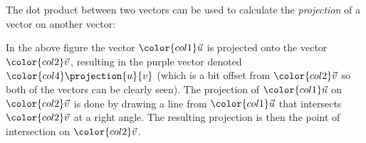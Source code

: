 The dot product between two vectors can be used to calculate the \emph{projection} of a vector on another vector:
\begin{figure}[H]
  \centering
\end{figure}

In the above figure the vector $\color{col1}\vec{u}$ is projected onto the vector $\color{col2}\vec{v}$, resulting in the purple vector denoted $\color{col4}\projection{u}{v}$ (which is a bit offset from $\color{col2}\vec{v}$ so both of the vectors can be clearly seen). The projection of $\color{col1}\vec{u}$ on $\color{col2}\vec{v}$ is done by drawing a line from $\color{col1}\vec{u}$ that intersects $\color{col2}\vec{v}$ at a right angle. The resulting projection is then the point of intersection on $\color{col2}\vec{v}$.

